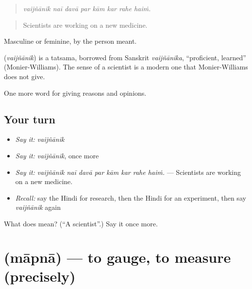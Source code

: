 \begin{quote}
       
\end{quote}

\begin{quote}
\emph{vaijñānik naī davā par kām kar rahe haiṁ.}
\end{quote}

\begin{quote}
Scientists are working on a new medicine.
\end{quote}

Masculine or feminine, by the person meant.

\begin{cousinweb}
\textbf{} (\emph{vaijñānik}) is a tatsama, borrowed from Sanskrit \emph{vaijñānika}, \textquotedblleft{}proficient, learned\textquotedblright{} (Monier-Williams). The sense of a scientist is a modern one that Monier-Williams does not give.
\end{cousinweb}

\begin{grammarlens}[title={What you've built}]
One more word for giving reasons and opinions.
\end{grammarlens}

\subsection*{Your turn}
\begin{itemize}
\raggedright
  \item \emph{Say it:} \emph{vaijñānik}
  \item \emph{Say it:} \emph{vaijñānik}, once more
  \item \emph{Say it:} \emph{vaijñānik naī davā par kām kar rahe haiṁ.} — Scientists are working on a new medicine.
  \item \emph{Recall:} say the Hindi for research, then the Hindi for an experiment, then say \emph{vaijñānik} again
\end{itemize}

\begin{tcolorbox}[breakable,colback=teal!4,colframe=teal!35!black,title={Before you move on}]
What does  mean? (\textquotedblleft{}A scientist\textquotedblright{}.) Say it once more.
\end{tcolorbox}
\section[\texorpdfstring{\hi{मापना} (māpnā)}{मापना (māpnā)}]{ (māpnā) — to gauge, to measure (precisely)}

